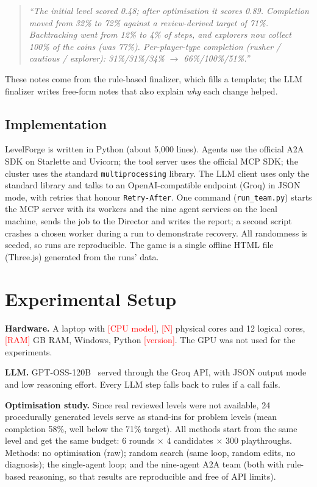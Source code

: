 \documentclass[conference]{IEEEtran}
\newcommand{\fillme}[1]{\textcolor{red}{[#1]}}
\begin{document}
\begin{quote}
\small\itshape
``The initial level scored 0.48; after optimisation it scores 0.89. Completion moved from 32\% to
72\% against a review-derived target of 71\%. Backtracking went from 12\% to 4\% of steps, and
explorers now collect 100\% of the coins (was 77\%). Per-player-type completion (rusher / cautious /
explorer): 31\%/31\%/34\% $\to$ 66\%/100\%/51\%.''
\end{quote}

\noindent These notes come from the rule-based finalizer, which fills a template; the LLM
finalizer writes free-form notes that also explain \emph{why} each change helped.

\subsection{Implementation}
LevelForge is written in Python (about 5,000 lines). Agents use the official A2A SDK on Starlette
and Uvicorn; the tool server uses the official MCP SDK; the cluster uses the standard
\texttt{multiprocessing} library. The LLM client uses only the standard library and talks to an
OpenAI-compatible endpoint (Groq) in JSON mode, with retries that honour \texttt{Retry-After}. One
command (\texttt{run\_team.py}) starts the MCP server with its workers and the nine agent services
on the local machine, sends the job to the Director and writes the report; a second script crashes
a chosen worker during a run to demonstrate recovery. All randomness is seeded, so runs are
reproducible. The game is a single offline HTML file (Three.js) generated from the runs' data.

\section{Experimental Setup}
\textbf{Hardware.} A laptop with \fillme{CPU model}, \fillme{N} physical cores and 12 logical
cores, \fillme{RAM} GB RAM, Windows, Python \fillme{version}. The GPU was not used for the
experiments.

\textbf{LLM.} GPT-OSS-120B~\cite{openai2025gptoss} served through the Groq API, with JSON output
mode and low reasoning effort. Every LLM step falls back to rules if a call fails.

\textbf{Optimisation study.} Since real reviewed levels were not available, 24 procedurally
generated levels serve as stand-ins for problem levels (mean completion 58\%, well below the 71\%
target). All methods start from the same level and get the same budget: 6 rounds $\times$ 4
candidates $\times$ 300 playthroughs. Methods: no optimisation (raw); random search (same loop,
random edits, no diagnosis); the single-agent loop; and the nine-agent A2A team (both with rule-based
reasoning, so that results are reproducible and free of API limits).
\end{document}
